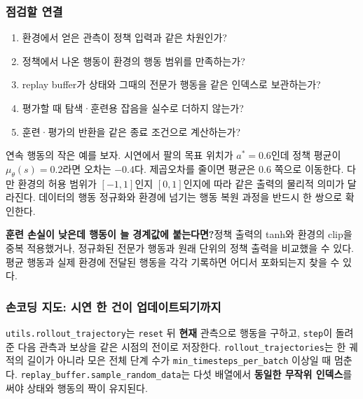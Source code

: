 \documentclass[11pt,a4paper]{article}
\begin{document}
\subsubsection{점검할 연결}

\begin{enumerate}
\item 환경에서 얻은 관측이 정책 입력과 같은 차원인가?
\item 정책에서 나온 행동이 환경의 행동 범위를 만족하는가?
\item replay buffer가 상태와 그때의 전문가 행동을 같은 인덱스로 보관하는가?
\item 평가할 때 탐색·훈련용 잡음을 실수로 더하지 않는가?
\item 훈련·평가의 반환을 같은 종료 조건으로 계산하는가?
\end{enumerate}

연속 행동의 작은 예를 보자. 시연에서 팔의 목표 위치가 $a^*=0.6$인데 정책 평균이 $\mu_\theta(s)=0.2$라면 오차는 $-0.4$다. 제곱오차를 줄이면 평균은 $0.6$ 쪽으로 이동한다. 다만 환경의 허용 범위가 $[-1,1]$인지 $[0,1]$인지에 따라 같은 출력의 물리적 의미가 달라진다. 데이터의 행동 정규화와 환경에 넘기는 행동 복원 과정을 반드시 한 쌍으로 확인한다.\par

\par\medskip\noindent\textbf{훈련 손실이 낮은데 행동이 늘 경계값에 붙는다면?}\quad 정책 출력의 tanh와 환경의 clip을 중복 적용했거나, 정규화된 전문가 행동과 원래 단위의 정책 출력을 비교했을 수 있다. 평균 행동과 실제 환경에 전달된 행동을 각각 기록하면 어디서 포화되는지 찾을 수 있다.\par

\subsubsection{손코딩 지도: 시연 한 건이 업데이트되기까지}

\texttt{utils.\allowbreak{}rollout\_\allowbreak{}trajectory}는 \texttt{reset} 뒤 \textbf{현재} 관측으로 행동을 구하고, \texttt{step}이 돌려준 다음 관측과 보상을 같은 시점의 전이로 저장한다. \texttt{rollout\_\allowbreak{}trajectories}는 한 궤적의 길이가 아니라 모은 전체 단계 수가 \texttt{min\_\allowbreak{}timesteps\_\allowbreak{}per\_\allowbreak{}batch} 이상일 때 멈춘다. \texttt{replay\_\allowbreak{}buffer.\allowbreak{}sample\_\allowbreak{}random\_\allowbreak{}data}는 다섯 배열에서 \textbf{동일한 무작위 인덱스}를 써야 상태와 행동의 짝이 유지된다.\par
\end{document}
